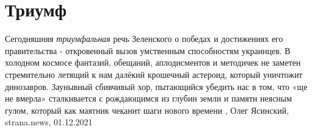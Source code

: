  
 
 
 
 
\chapter{Триумф}

Сегодняшняя \emph{триумфальная} речь Зеленского о победах и достижениях его
правительства - откровенный вызов умственным способностям украинцев. В холодном
космосе фантазий, обещаний, аплодисментов и методичек не заметен стремительно
летящий к нам далёкий крошечный астероид, который уничтожит динозавров.
Заунывный сбивчивый хор, пытающийся убедить нас в том, что «ще не вмерла»
сталкивается с рождающимся из глубин земли и памяти неясным гулом, который как
маятник чеканит шаги нового времени
, 
Олег Ясинский, strana.news, 01.12.2021
